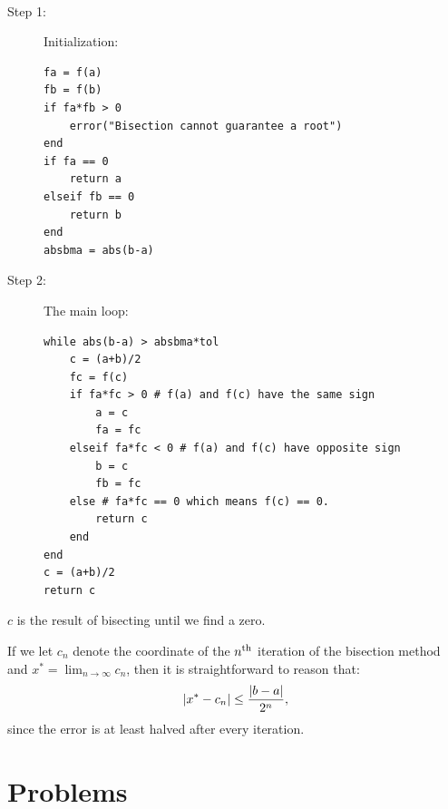 \begin{algorithm}[Bisection]~\\
\begin{description}
\item[Step 1:] Initialization:
\begin{verbatim}
fa = f(a)
fb = f(b)
if fa*fb > 0
    error("Bisection cannot guarantee a root")
end
if fa == 0
    return a
elseif fb == 0
    return b
end
absbma = abs(b-a)
\end{verbatim}
\item[Step 2:] The main loop:
\begin{verbatim}
while abs(b-a) > absbma*tol
    c = (a+b)/2
    fc = f(c)
    if fa*fc > 0 # f(a) and f(c) have the same sign
        a = c
        fa = fc
    elseif fa*fc < 0 # f(a) and f(c) have opposite sign
        b = c
        fb = fc
    else # fa*fc == 0 which means f(c) == 0.
        return c
    end
end
c = (a+b)/2
return c
\end{verbatim}
\end{description}
$c$ is the result of bisecting until we find a zero.
\end{algorithm}

If we let $c_n$ denote the coordinate of the $n^{\rm th}$ iteration of the bisection method and $\displaystyle x^* = \lim_{n\to\infty} c_n$, then it is straightforward to reason that:
\begin{equation}\label{eq:bisectionerror}
\left|{x^* - c_n}\right| \le \frac{\left|{b-a}\right|}{2^n},
\end{equation}
since the error is at least halved after every iteration.

\section{Problems}

